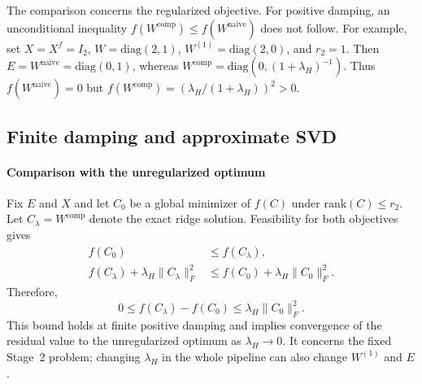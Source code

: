 The comparison concerns the regularized objective. For positive damping, an unconditional inequality $f(W^{\mathrm{comp}})\le f(W^{\mathrm{naive}})$ does not follow. For example, set $X=X^f=I_2$, $W=\mathrm{diag}(2,1)$, $W^{(1)}=\mathrm{diag}(2,0)$, and $r_2=1$. Then $E=W^{\mathrm{naive}}=\mathrm{diag}(0,1)$, whereas $W^{\mathrm{comp}}=\mathrm{diag}(0,(1+\lambda_H)^{-1})$. Thus $f(W^{\mathrm{naive}})=0$ but $f(W^{\mathrm{comp}})=(\lambda_H/(1+\lambda_H))^2>0$.

\subsection{Finite damping and approximate SVD}\label{sup:two-step-approximation}

\paragraph{Comparison with the unregularized optimum}
Fix $E$ and $X$ and let $C_0$ be a global minimizer of $f(C)$ under $\mathrm{rank}(C)\le r_2$. Let $C_\lambda=W^{\mathrm{comp}}$ denote the exact ridge solution. Feasibility for both objectives gives
\begin{equation}
\begin{aligned}
f(C_0)&\le f(C_\lambda), \\
f(C_\lambda)+\lambda_H\|C_\lambda\|_F^2
&\le f(C_0)+\lambda_H\|C_0\|_F^2.
\end{aligned}
\end{equation}
Therefore,
\begin{equation}
0\le f(C_\lambda)-f(C_0)\le\lambda_H\|C_0\|_F^2.
\label{eq:sup-finite-damping-bound}
\end{equation}
This bound holds at finite positive damping and implies convergence of the residual value to the unregularized optimum as $\lambda_H\to0$. It concerns the fixed Stage~2 problem; changing $\lambda_H$ in the whole pipeline can also change $W^{(1)}$ and $E$.

